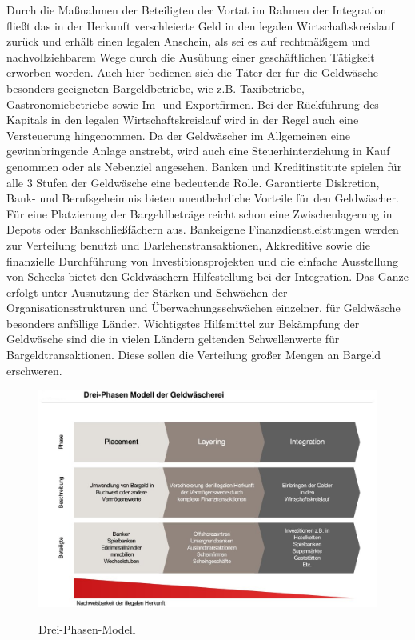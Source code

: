 \documentclass{article}
\begin{document}
\begin{enumerate}
                        Durch die Maßnahmen der Beteiligten der Vortat im Rahmen der Integration fließt das in der Herkunft verschleierte Geld in den legalen Wirtschaftskreislauf zurück und erhält einen legalen Anschein, als sei es auf rechtmäßigem und nachvollziehbarem Wege durch die Ausübung einer geschäftlichen Tätigkeit erworben worden. Auch hier bedienen sich die Täter der für die Geldwäsche besonders geeigneten Bargeldbetriebe, wie z.B. Taxibetriebe, Gastronomiebetriebe sowie Im- und Exportfirmen.
                        Bei der Rückführung des Kapitals in den legalen Wirtschaftskreislauf wird in der Regel auch eine Versteuerung hingenommen. Da der Geldwäscher im Allgemeinen eine gewinnbringende Anlage anstrebt, wird auch eine Steuerhinterziehung in Kauf genommen oder als Nebenziel angesehen.
                        Banken und Kreditinstitute spielen für alle 3 Stufen der Geldwäsche eine bedeutende Rolle. Garantierte Diskretion, Bank- und Berufsgeheimnis bieten unentbehrliche Vorteile für den Geldwäscher. Für eine Platzierung der Bargeldbeträge reicht schon eine Zwischenlagerung in Depots oder Bankschließfächern aus. Bankeigene Finanzdienstleistungen werden zur Verteilung benutzt und Darlehenstransaktionen, Akkreditive sowie die finanzielle Durchführung von Investitionsprojekten und die einfache Ausstellung von Schecks bietet den Geldwäschern Hilfestellung bei der Integration. Das Ganze erfolgt unter Ausnutzung der Stärken und Schwächen der Organisationsstrukturen und Überwachungsschwächen einzelner, für Geldwäsche besonders anfällige Länder.
                        Wichtigstes Hilfsmittel zur Bekämpfung der Geldwäsche sind die in vielen Ländern geltenden Schwellenwerte für Bargeldtransaktionen. Diese sollen die Verteilung großer Mengen an Bargeld erschweren.

                \end{enumerate}
               
                \begin{figure}[H]
                    \centering
                        \includegraphics[scale=0.3]{../../turandon/data/drei_phasen_modell.png}
                            \caption{Drei-Phasen-Modell}
                    \label{fig2}
                        \cite{Abb1}
                \end{figure}
\end{document}
